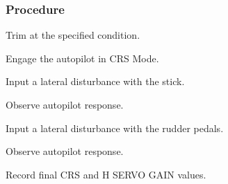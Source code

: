  \subsubsection*{Procedure}
 \begin{compactenum}
    \item Trim at the specified condition.
    \item Engage the autopilot in CRS Mode.
    \item Input a lateral disturbance with the stick.  
    \item Observe autopilot response.
    \item Input a lateral disturbance with the rudder pedals.  
    \item Observe autopilot response.
    \item Record final CRS and H SERVO GAIN values.
    \end{compactenum}
